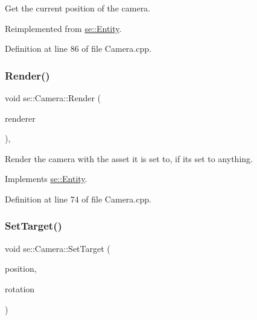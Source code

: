 Get the current position of the camera. 

Reimplemented from \mbox{\hyperlink{classse_1_1_entity_a40f94e236b724c4e375ee51f923de475}{se\+::\+Entity}}.



Definition at line 86 of file Camera.\+cpp.

\mbox{\label{classse_1_1_camera_accc1f78d52fca1e68c5267fbc0fef239}} 
\subsubsection{\texorpdfstring{Render()}{Render()}}
{\footnotesize\ttfamily void se\+::\+Camera\+::\+Render (\begin{DoxyParamCaption}\item[{\mbox{\hyperlink{classse_1_1_abstract_renderer}{Abstract\+Renderer}} $\ast$}]{renderer }\end{DoxyParamCaption})\hspace{0.3cm}{\ttfamily [override]}, {\ttfamily [virtual]}}

Render the camera with the asset it is set to, if it\textquotesingle{}s set to anything. 

Implements \mbox{\hyperlink{classse_1_1_entity_a50066f09c64b3b9705b71366cc565527}{se\+::\+Entity}}.



Definition at line 74 of file Camera.\+cpp.

\mbox{\label{classse_1_1_camera_ac49219007d931e1800a33d2603f08856}} 
\subsubsection{\texorpdfstring{Set\+Target()}{SetTarget()}}
{\footnotesize\ttfamily void se\+::\+Camera\+::\+Set\+Target (\begin{DoxyParamCaption}\item[{\mbox{\hyperlink{namespacese_a12e07512d95e2fdebdaf74a5ea2cf5f6}{Vector3f}} $\ast$}]{position,  }\item[{\mbox{\hyperlink{namespacese_a12e07512d95e2fdebdaf74a5ea2cf5f6}{Vector3f}} $\ast$}]{rotation }\end{DoxyParamCaption})}

